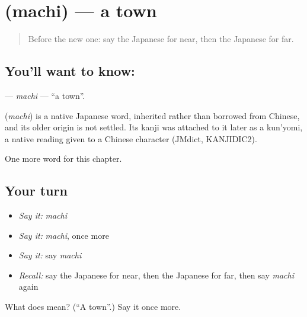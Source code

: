 \section[\texorpdfstring{\ja{まち} (machi)}{まち (machi)}]{ (machi) — a town}

\label{lesson:JA-C57-machi}



\begin{quote}
Before the new one: say the Japanese for near, then the Japanese for far.
\end{quote}

\subsection*{You'll want to know: }
\textbf{} — \emph{machi} — \textquotedblleft{}a town\textquotedblright{}.

\begin{cousinweb}
\textbf{} (\emph{machi}) is a native Japanese word, inherited rather than borrowed from Chinese, and its older origin is not settled. Its kanji was attached to it later as a kun'yomi, a native reading given to a Chinese character (JMdict, KANJIDIC2).
\end{cousinweb}

\begin{grammarlens}[title={What you've built}]
One more word for this chapter.
\end{grammarlens}

\subsection*{Your turn}
\begin{itemize}
\raggedright
  \item \emph{Say it:} \emph{machi}
  \item \emph{Say it:} \emph{machi}, once more
  \item \emph{Say it:} say \emph{machi}
  \item \emph{Recall:} say the Japanese for near, then the Japanese for far, then say \emph{machi} again
\end{itemize}

\begin{tcolorbox}[breakable,colback=teal!4,colframe=teal!35!black,title={Before you move on}]
What does  mean? (\textquotedblleft{}A town\textquotedblright{}.) Say it once more.
\end{tcolorbox}
